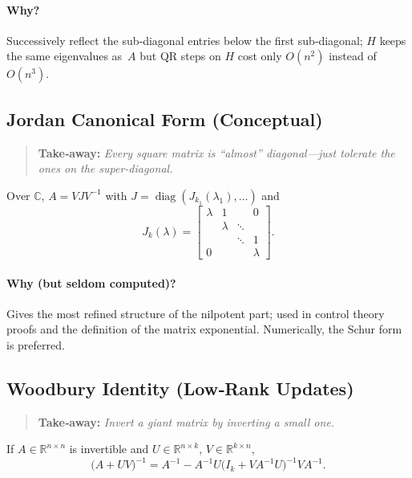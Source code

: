 \paragraph{Why?}
Successively reflect the sub‑diagonal entries below the first sub‑diagonal; $H$ keeps the same eigenvalues as $A$ but QR steps on $H$ cost only $O(n^2)$ instead of $O(n^3)$.

\subsection{Jordan Canonical Form (Conceptual)}
\begin{quote}
\textbf{Take‑away:} \emph{Every square matrix is “almost” diagonal—just tolerate the ones on the super‑diagonal.}
\end{quote}

Over $\mathbb C$, $A=V J V^{-1}$ with $J=\operatorname{diag}(J_{k_1}(\lambda_1),\dots)$ and
\[
J_k(\lambda)=
\begin{bmatrix}
\lambda & 1      &        & 0\\
        & \lambda& \ddots &  \\
        &        & \ddots & 1\\
0       &        &        & \lambda
\end{bmatrix}\!.
\]

\paragraph{Why (but seldom computed)?}
Gives the most refined structure of the nilpotent part; used in control theory proofs and the definition of the matrix exponential.  
Numerically, the Schur form is preferred.

\subsection{Woodbury Identity (Low‑Rank Updates)}
\begin{quote}
\textbf{Take‑away:} \emph{Invert a giant matrix by inverting a small one.}
\end{quote}

If $A\in\mathbb R^{n\times n}$ is invertible and $U\in\mathbb R^{n\times k}$, $V\in\mathbb R^{k\times n}$,
\[
\bigl(A + U V\bigr)^{-1} = A^{-1} - A^{-1}U\bigl(I_k + V A^{-1} U\bigr)^{-1}V A^{-1}.
\]

